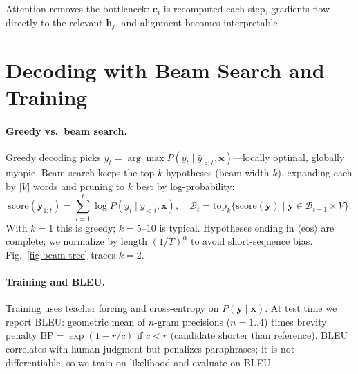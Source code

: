 Attention removes the bottleneck: $\mathbf{c}_i$ is recomputed each step, gradients flow directly to the relevant $\mathbf{h}_j$, and alignment becomes interpretable.

\section{Decoding with Beam Search and Training}
\label{sec:beam-bleu}
\paragraph{Greedy vs.\ beam search.} Greedy decoding picks $\hat{y}_t=\arg\max P(y_t\mid\hat{y}_{<t},\mathbf{x})$---locally optimal, globally myopic. Beam search keeps the top-$k$ hypotheses (beam width $k$), expanding each by $|V|$ words and pruning to $k$ best by log-probability:
\begin{equation}
\mathrm{score}(\mathbf{y}_{1:t})=\sum_{i=1}^{t}\log P(y_i\mid y_{<i},\mathbf{x}),\quad \mathcal{B}_t=\mathrm{top}_k\{\mathrm{score}(\mathbf{y})\mid \mathbf{y}\in \mathcal{B}_{t-1}\times V\}.
\label{eq:beam}
\end{equation}
With $k=1$ this is greedy; $k=5$--$10$ is typical. Hypotheses ending in $\langle\text{eos}\rangle$ are complete; we normalize by length $(1/T)^\alpha$ to avoid short-sequence bias. Fig.~\ref{fig:beam-tree} traces $k=2$.

\paragraph{Training and BLEU.} Training uses teacher forcing and cross-entropy on $P(\mathbf{y}\mid\mathbf{x})$. At test time we report BLEU: geometric mean of $n$-gram precisions ($n=1..4$) times brevity penalty $\mathrm{BP}=\exp(1-r/c)$ if $c<r$ (candidate shorter than reference). BLEU correlates with human judgment but penalizes paraphrases; it is not differentiable, so we train on likelihood and evaluate on BLEU.

